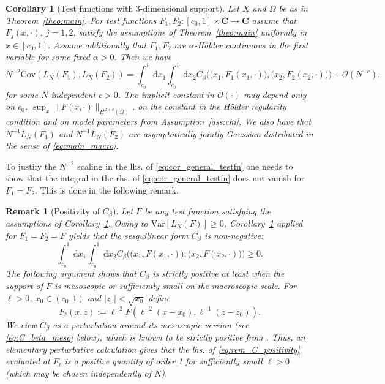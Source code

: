 \documentclass[10pt]{amsart}
\newtheorem{corollary}[theorem]{Corollary}
\newtheorem{remark}[theorem]{Remark}
\numberwithin{equation}{section}
\newcommand{\dif}{\mathrm{d}}
\newcommand{\C}{\mathbf{C}}
\newcommand{\Cov}{\mathrm{Cov}}
\newcommand{\Var}{\mathrm{Var}}
\begin{document}
\begin{corollary}[Test functions with 3-dimensional support]\label{cor:general_testfn} Let $X$ and $\Omega$ be as in Theorem~\ref{theo:main}. For test functions $F_1,F_2:[c_0,1]\times\C\to \C$ assume that $F_j(x,\cdot)$, $j=1,2$, satisfy the assumptions of Theorem~\ref{theo:main} uniformly in $x\in[c_0,1]$. Assume additionally that $F_1,F_2$ are $\alpha$-H{\"o}lder continuous in the first variable for some fixed $\alpha>0$. Then we have
\begin{equation}
N^{-2}\Cov\left(L_N(F_1),L_N(F_2)\right)=\int_{c_0}^1\dif x_1\int_{c_0}^1\dif x_2 C_\beta\Big(\big(x_1,F_1(x_1,\cdot)\big),\big(x_2,F_2(x_2,\cdot)\big)\Big)+\mathcal{O}(N^{-c}),
\label{eq:cor_general_testfn}
\end{equation} 
for some $N$-independent $c>0$. The implicit constant in $\mathcal{O}(\cdot)$ may depend only on $c_0$, $\sup_x \|F(x,\cdot)\|_{H^{2+\delta}(\Omega)}$, on the constant in the H{\"o}lder regularity condition and on model parameters from Assumption~\ref{ass:chi}. We also have that $N^{-1}L_N(F_1)$ and $N^{-1}L_N(F_2)$ are asymptotically jointly Gaussian distributed in the sense of \eqref{eq:main_macro}.
\end{corollary}


To justify the $N^{-2}$ scaling in the lhs. of \eqref{eq:cor_general_testfn} one needs to show that the integral in the rhs. of \eqref{eq:cor_general_testfn} does not vanish for $F_1=F_2$. This is done in the following remark.

\begin{remark}[Positivity of $C_\beta$] Let $F$ be any test function satisfying the assumptions of Corollary~\ref{cor:general_testfn}. Owing to $\Var[L_N(F)]\ge 0$, Corollary~\ref{cor:general_testfn} applied for $F_1=F_2=F$ yields that the sesquilinear form $C_\beta$ is non-negative:
\begin{equation}
\int_{c_0}^1\dif x_1\int_{c_0}^1\dif x_2 C_\beta\Big(\big(x_1,F(x_1,\cdot)\big),\big(x_2,F(x_2,\cdot)\big)\Big)\ge 0.
\label{eq:rem_C_positivity}
\end{equation}
The following argument shows that $C_\beta$ is strictly positive at least when the support of $F$ is mesoscopic or sufficiently small on the macroscopic scale. For $\ell>0$, $x_0\in (c_0,1)$ and $|z_0|<\sqrt{x_0}$ define 
\begin{equation}
F_\ell(x,z):=\ell^{-2} F\left(\ell^{-2}(x-x_0), \ell^{-1}(z-z_0)\right).
\end{equation}
We view $C_\beta$ as a perturbation around its mesoscopic version (see \eqref{eq:C_beta_meso} below), which is known to be strictly positive from \cite[Section~5.5]{bourgade2024fluctuations}. Thus, an elementary perturbative calculation gives that the lhs. of \eqref{eq:rem_C_positivity} evaluated at $F_\ell$ is a positive quantity of order 1 for sufficiently small $\ell>0$ (which may be chosen independently of $N$).
\end{remark}
\end{document}
